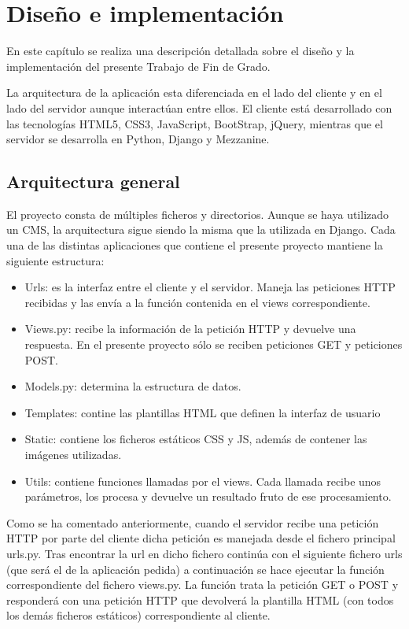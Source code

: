 \cleardoublepage
\chapter{Diseño e implementación}
\label{chap:design_implement}



En este capítulo se realiza una descripción detallada sobre el diseño y la implementación del presente Trabajo de Fin de Grado.


La arquitectura de la aplicación esta diferenciada en el lado del cliente y en el lado del servidor aunque interactúan entre ellos. El cliente está desarrollado con las tecnologías HTML5, CSS3, JavaScript, BootStrap, jQuery, mientras que el servidor se desarrolla en Python, Django y Mezzanine.



\section{Arquitectura general} 
\label{sec:arquitectura}


El proyecto consta de múltiples ficheros y directorios. Aunque se haya utilizado un CMS, la arquitectura sigue siendo la misma que la utilizada en Django. Cada una de las distintas aplicaciones que contiene el presente proyecto mantiene la siguiente estructura:
\begin{itemize}
\item Urls: es la interfaz entre el cliente y el servidor. Maneja las peticiones HTTP recibidas y las envía a la función contenida en el views correspondiente.
\item Views.py: recibe la información de la petición HTTP y devuelve una respuesta. En el presente proyecto sólo se reciben peticiones GET y peticiones POST.
\item Models.py: determina la estructura de datos.
\item Templates: contine las plantillas HTML que definen la interfaz de usuario
\item Static: contiene los ficheros estáticos CSS y JS, además de contener las imágenes utilizadas.
\item Utils: contiene funciones llamadas por el views. Cada llamada recibe unos parámetros, los procesa y devuelve un resultado fruto de ese procesamiento.
\end{itemize}


Como se ha comentado anteriormente, cuando el servidor recibe una petición HTTP por parte del cliente dicha petición es manejada desde el fichero principal urls.py. Tras encontrar la url en dicho fichero continúa con el siguiente fichero urls (que será el de la aplicación pedida) a continuación se hace ejecutar la función correspondiente del fichero views.py. La función trata la petición GET o POST y responderá con una petición HTTP que devolverá la plantilla HTML (con todos los demás ficheros estáticos) correspondiente al cliente.



